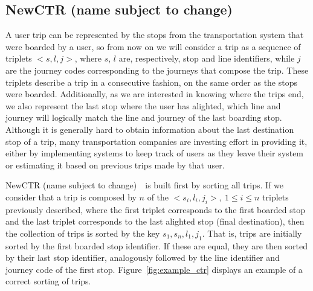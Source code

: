 \documentclass[runningheads]{llncs}
\newcommand{\ctr}{NewCTR (name subject to change)\ }
\begin{document}
\subsection{\ctr}
A user trip can be represented by the stops from the transportation system that were boarded by a user, so from now on we will consider a trip as a sequence of triplets $<s,l,j>$, where $s$, $l$ are, respectively, stop and line identifiers, while $j$ are the journey codes corresponding to the journeys that compose the trip. These triplets describe a trip in a consecutive fashion, on the same order as the stops were boarded. Additionally, as we are interested in knowing where the trips end, we also represent the last stop where the user has alighted, which line and journey will logically match the line and journey of the last boarding stop. Although it is generally hard to obtain information about the last destination stop of a trip, many transportation companies are investing effort in providing it, either by implementing systems to keep track of users as they leave their system or estimating it based on previous trips made by that user.

\ctr~is built first by sorting all trips. If we consider that a trip is composed by $n$ of the $<s_i,l_i,j_i>,~1\leq i\leq n$ triplets previously described, where the first triplet corresponds to the first boarded stop and the last triplet corresponds to the last alighted stop (final destination), then the collection of trips is sorted by the key $s_1,s_n,l_1,j_1$. That is, trips are initially sorted by the first boarded stop identifier. If these are equal, they are then sorted by their last stop identifier, analogously followed by the line identifier and journey code of the first stop. Figure~\ref{fig:example_ctr} displays an example of a correct sorting of trips.
\end{document}
